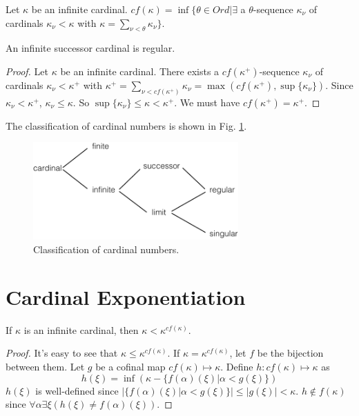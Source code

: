 \documentclass[12pt]{book}
\begin{document}
\begin{corollary}
	Let $\kappa$ be an infinite cardinal. $cf(\kappa)=\inf\{\theta\in Ord|\exists$ a $\theta$-sequence $\kappa_\nu$ of cardinals $\kappa_\nu<\kappa$ with $\kappa=\sum_{\nu<\theta}\kappa_\nu\}$. 
\end{corollary}

\begin{corollary}
	An infinite successor cardinal is regular.
\end{corollary}
\begin{proof}
	Let $\kappa$ be an infinite cardinal. There exists a $cf(\kappa^+)$-sequence $\kappa_\nu$ of cardinals $\kappa_\nu<\kappa^+$ with $\kappa^+=\sum_{\nu<cf(\kappa^+)}\kappa_\nu=\max(cf(\kappa^+),\sup\{\kappa_\nu\})$. Since $\kappa_\nu<\kappa^+$, $\kappa_\nu\leq\kappa$. So $\sup\{\kappa_\nu\}\leq\kappa<\kappa^+$.  We must have $cf(\kappa^+)=\kappa^+$.
\end{proof}

The classification of cardinal numbers is shown in Fig. \ref{fig:cardinal1}.

\begin{figure}[htb!]
	\centering  
	\includegraphics[width=0.7\textwidth ]{resources/part_set/cardinal1.pdf}  
	\caption{Classification of cardinal numbers.}
	\label{fig:cardinal1}
\end{figure}

\section{Cardinal Exponentiation}

\begin{theorem}[K\"onig]
	If $\kappa$ is an infinite cardinal, then $\kappa<\kappa^{cf(\kappa)}$.
\end{theorem}
\begin{proof}
	It's easy to see that $\kappa\leq\kappa^{cf(\kappa)}$. If $\kappa=\kappa^{cf(\kappa)}$, let $f$ be the bijection between them. Let $g$ be a cofinal map $cf(\kappa)\mapsto\kappa$. Define $h:cf(\kappa)\mapsto\kappa$ as
	\begin{equation}
		h(\xi)=\inf(\kappa- \{f(\alpha)(\xi)|\alpha<g(\xi)\})
	\end{equation}
	$h(\xi)$ is well-defined since $|\{f(\alpha)(\xi)|\alpha<g(\xi)\}|\leq|g(\xi)|<\kappa$. $h\not\in f(\kappa)$ since $\forall \alpha\exists\xi (h(\xi)\neq f(\alpha)(\xi))$.
\end{proof}
\end{document}
